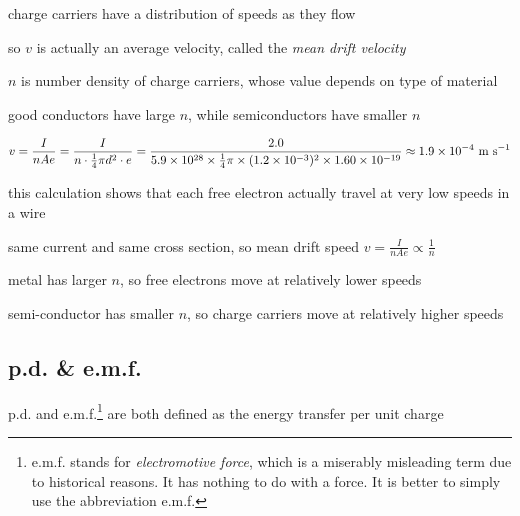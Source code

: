 \cmt charge carriers have a distribution of speeds as they flow

so $v$ is actually an average velocity, called the \emph{mean drift velocity}

\cmt $n$ is number density of charge carriers, whose value depends on type of material

good conductors have large $n$, while semiconductors have smaller $n$



\begin{soln}\begin{equation*}
v = \frac{I}{nAe} = \frac{I}{n\cdot\frac{1}{4} \pi d^2 \cdot e} = \frac{2.0}{5.9\times10^{28} \times \frac{1}{4}\pi \times (1.2\times10^{-3})^2\times1.60\times10^{-19}} \approx 1.9\times10^{-4} \text{ m s$^{-1}$}
\end{equation*}

\eqyskip this calculation shows that each free electron actually travel at very low speeds in a wire \end{soln}


\begin{soln}
    
same current and same cross section, so mean drift speed $ v = \frac{I}{nAe} \propto \frac{1}{n}$

metal has larger $n$, so free electrons move at relatively lower speeds

semi-conductor has smaller $n$, so charge carriers move at relatively higher speeds \end{soln}




\subsection{p.d. \& e.m.f.}\label{ch:potential-difference}

p.d. and e.m.f.\footnote{e.m.f. stands for \emph{electromotive force}, which is a miserably misleading term due to historical reasons. It has nothing to do with a force. It is better to simply use the abbreviation e.m.f.} are both defined as the energy transfer per unit charge

